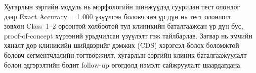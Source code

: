 Хугарлын зэргийн модуль нь морфологийн шинжүүдэд суурилан тест олонлог дээр Exact Accuracy = 1.000 үзүүлсэн боловч энэ үр дүн нь тест олонлогт зөвхөн Class~1--2 орсонтой холбоотой тул клиникийн баталгаажсан үр дүн бус, proof-of-concept хүрээний урьдчилсан үзүүлэлт гэж тайлбарлав. Загвар нь эмчийн хяналт дор клиникийн шийдвэрийг дэмжих (CDS) хэрэгсэл болох боломжтой боловч сегментчлэлийн тогтворжилт, хугарлын зэргийн клиник баталгаажуулалт болон эдгэрэлтийн бодит follow-up өгөгдөлд нэмэлт сайжруулалт шаардагдана.

